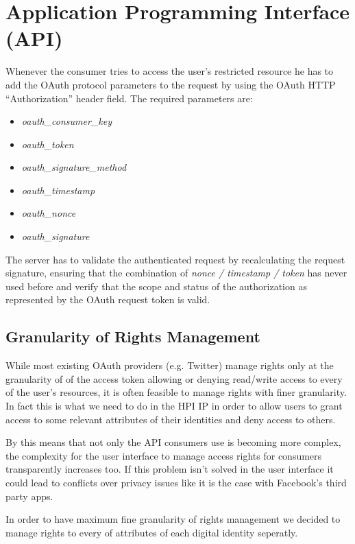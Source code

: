 \section{Application Programming Interface (API)}

Whenever the consumer tries to access the user's restricted
resource he has to add the OAuth protocol parameters to the request
by using the OAuth HTTP ``Authorization'' header field. The
required parameters are:

\begin{itemize}
\item
  \emph{oauth\_consumer\_key}
\item
  \emph{oauth\_token}
\item
  \emph{oauth\_signature\_method}
\item
  \emph{oauth\_timestamp}
\item
  \emph{oauth\_nonce}
\item
  \emph{oauth\_signature}
\end{itemize}
The server has to validate the authenticated request by
recalculating the request signature, ensuring that the combination
of \emph{nonce / timestamp / token} has never used before and
verify that the scope and status of the authorization as
represented by the OAuth request token is valid.

\subsection{Granularity of Rights Management}

While most existing OAuth providers (e.g. Twitter) manage rights
only at the granularity of of the access token allowing or denying
read/write access to every of the user's resources, it is often
feasible to manage rights with finer granularity. In fact this is
what we need to do in the HPI IP in order to allow users to grant
access to some relevant attributes of their identities and deny
access to others.

By this means that not only the API consumers use is becoming more
complex, the complexity for the user interface to manage access
rights for consumers transparently increases too. If this problem
isn't solved in the user interface it could lead to conflicts over
privacy issues like it is the case with Facebook's third party
apps.

In order to have maximum fine granularity of rights management we
decided to manage rights to every of attributes of each digital
identity seperatly.

